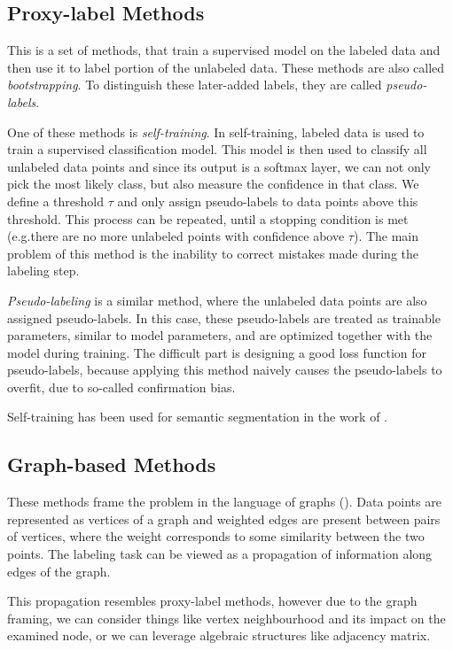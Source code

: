 \subsection{Proxy-label Methods}

This is a set of methods, that train a supervised model on the labeled data and then use it to label portion of the unlabeled data. These methods are also called \emph{bootstrapping}. To distinguish these later-added labels, they are called \emph{pseudo-labels}.

One of these methods is \emph{self-training}. In self-training, labeled data is used to train a supervised classification model. This model is then used to classify all unlabeled data points and since its output is a softmax layer, we can not only pick the most likely class, but also measure the confidence in that class. We define a threshold $\tau$ and only assign pseudo-labels to data points above this threshold. This process can be repeated, until a stopping condition is met (e.g.\@ there are no more unlabeled points with confidence above $\tau$). The main problem of this method is the inability to correct mistakes made during the labeling step.

\emph{Pseudo-labeling} is a similar method, where the unlabeled data points are also assigned pseudo-labels. In this case, these pseudo-labels are treated as trainable parameters, similar to model parameters, and are optimized together with the model during training. The difficult part is designing a good loss function for pseudo-labels, because applying this method naively causes the pseudo-labels to overfit, due to so-called confirmation bias.

Self-training has been used for semantic segmentation in the work of \cite{SelfTrainingSegmentation}.


\subsection{Graph-based Methods}

These methods frame the problem in the language of graphs (\cite{SslTechnicalReport}). Data points are represented as vertices of a graph and weighted edges are present between pairs of vertices, where the weight corresponds to some similarity between the two points. The labeling task can be viewed as a propagation of information along edges of the graph.

This propagation resembles proxy-label methods, however due to the graph framing, we can consider things like vertex neighbourhood and its impact on the examined node, or we can leverage algebraic structures like adjacency matrix.

